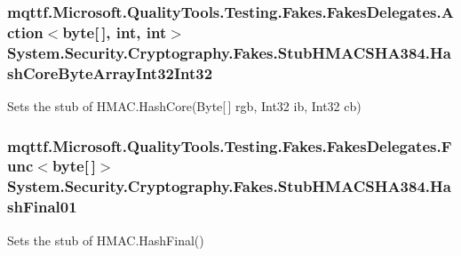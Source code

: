 \hypertarget{class_system_1_1_security_1_1_cryptography_1_1_fakes_1_1_stub_h_m_a_c_s_h_a384_aa9c00d3a6631c04abf614b8e1a8a1912}{
\subsubsection[{Hash\-Core\-Byte\-Array\-Int32\-Int32}]{\setlength{\rightskip}{0pt plus 5cm}mqttf.\-Microsoft.\-Quality\-Tools.\-Testing.\-Fakes.\-Fakes\-Delegates.\-Action$<$byte\mbox{[}$\,$\mbox{]}, int, int$>$ System.\-Security.\-Cryptography.\-Fakes.\-Stub\-H\-M\-A\-C\-S\-H\-A384.\-Hash\-Core\-Byte\-Array\-Int32\-Int32}}\label{class_system_1_1_security_1_1_cryptography_1_1_fakes_1_1_stub_h_m_a_c_s_h_a384_aa9c00d3a6631c04abf614b8e1a8a1912}


Sets the stub of H\-M\-A\-C.\-Hash\-Core(\-Byte\mbox{[}$\,$\mbox{]} rgb, Int32 ib, Int32 cb)

\hypertarget{class_system_1_1_security_1_1_cryptography_1_1_fakes_1_1_stub_h_m_a_c_s_h_a384_ad34a2ca69ae0e8bfca9e307bc6af2f12}{
\subsubsection[{Hash\-Final01}]{\setlength{\rightskip}{0pt plus 5cm}mqttf.\-Microsoft.\-Quality\-Tools.\-Testing.\-Fakes.\-Fakes\-Delegates.\-Func$<$byte\mbox{[}$\,$\mbox{]}$>$ System.\-Security.\-Cryptography.\-Fakes.\-Stub\-H\-M\-A\-C\-S\-H\-A384.\-Hash\-Final01}}\label{class_system_1_1_security_1_1_cryptography_1_1_fakes_1_1_stub_h_m_a_c_s_h_a384_ad34a2ca69ae0e8bfca9e307bc6af2f12}


Sets the stub of H\-M\-A\-C.\-Hash\-Final()

